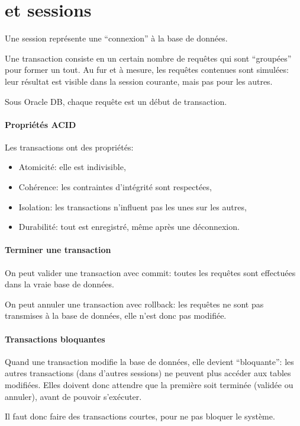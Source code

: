 \documentclass[10pt,a4paper,french]{article}
\begin{document}
\section{ et sessions}\label{transaction}

Une session représente une ``connexion'' à la base de données.

Une transaction consiste en un certain nombre de requêtes qui sont ``groupées'' pour former un tout. Au fur et à mesure, les requêtes contenues sont simulées: leur résultat est visible dans la session courante, mais pas pour les autres.

Sous Oracle DB, chaque requête est un début de transaction.

\paragraph{Propriétés ACID}
Les transactions ont des propriétés:
\begin{itemize}
\item Atomicité: elle est indivisible,
\item Cohérence: les contraintes d'intégrité sont respectées,
\item Isolation: les transactions n'influent pas les unes sur les autres,
\item Durabilité: tout est enregistré, même après une déconnexion.
\end{itemize}

\paragraph{Terminer une transaction}
On peut valider une transaction avec \gls{commit}: toutes les requêtes sont effectuées dans la vraie base de données.

On peut annuler une transaction avec \gls{rollback}: les requêtes ne sont pas transmises à la base de données, elle n'est donc pas modifiée.

\paragraph{Transactions bloquantes}
Quand une transaction modifie la base de données, elle devient ``bloquante'': les autres transactions (dans d'autres sessions) ne peuvent plus accéder aux tables modifiées. Elles doivent donc attendre que la première soit terminée (validée ou annuler), avant de pouvoir s'exécuter.

Il faut donc faire des transactions courtes, pour ne pas bloquer le système.
\end{document}
